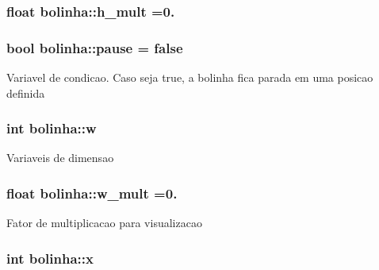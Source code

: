 \subsubsection[{\texorpdfstring{h\+\_\+mult}{h_mult}}]{\setlength{\rightskip}{0pt plus 5cm}float bolinha\+::h\+\_\+mult =0.\hspace{0.3cm}{\ttfamily [private]}}\hypertarget{classbolinha_add6888f6be8396c001dfa10e15d6a4be}{}\label{classbolinha_add6888f6be8396c001dfa10e15d6a4be}
\subsubsection[{\texorpdfstring{pause}{pause}}]{\setlength{\rightskip}{0pt plus 5cm}bool bolinha\+::pause = false\hspace{0.3cm}{\ttfamily [private]}}\hypertarget{classbolinha_a85326b85a811e46b6d98c900e141b0ef}{}\label{classbolinha_a85326b85a811e46b6d98c900e141b0ef}
Variavel de condicao. Caso seja true, a bolinha fica parada em uma posicao definida 
\subsubsection[{\texorpdfstring{w}{w}}]{\setlength{\rightskip}{0pt plus 5cm}int bolinha\+::w\hspace{0.3cm}{\ttfamily [private]}}\hypertarget{classbolinha_a4136d7cb978a3190073e1544fb336876}{}\label{classbolinha_a4136d7cb978a3190073e1544fb336876}
Variaveis de dimensao 
\subsubsection[{\texorpdfstring{w\+\_\+mult}{w_mult}}]{\setlength{\rightskip}{0pt plus 5cm}float bolinha\+::w\+\_\+mult =0.\hspace{0.3cm}{\ttfamily [private]}}\hypertarget{classbolinha_a91dd1f60f5312cf476e02e5396c2f871}{}\label{classbolinha_a91dd1f60f5312cf476e02e5396c2f871}
Fator de multiplicacao para visualizacao 
\subsubsection[{\texorpdfstring{x}{x}}]{\setlength{\rightskip}{0pt plus 5cm}int bolinha\+::x\hspace{0.3cm}{\ttfamily [private]}}\hypertarget{classbolinha_ad6918f0b95a774318e4ceb7c3f9720de}{}\label{classbolinha_ad6918f0b95a774318e4ceb7c3f9720de}
